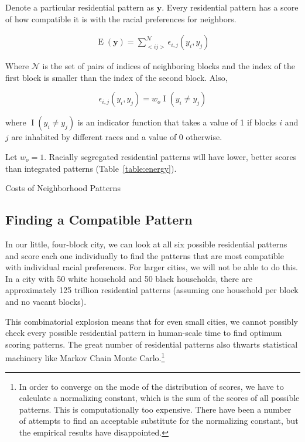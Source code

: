 Denote a particular residential pattern as $\mathbf{y}$.  Every 
residential pattern has a score of how compatible it is with
the racial preferences for neighbors.

\begin{align}
\operatorname{E}(\mathbf{y}) = \sum_{<i j>}^{\mathcal{N}}\epsilon_{i,j}(y_i,y_j)
\end{align}

Where $\mathcal{N}$ is the set of pairs of indices of neighboring
blocks and the index of the first block is smaller than the index of
the second block. Also, 

\begin{equation}
  \epsilon_{i,j}(y_i,y_j) = w_o\operatorname{I}(y_i \neq y_j)
\end{equation}

where $\operatorname{I}(y_i \neq y_j)$ is an indicator function that
takes a value of 1 if blocks $i$ and $j$ are inhabited by different
races and a value of 0 otherwise.

Let $w_o=1$. Racially segregated residential patterns will have lower,
better scores than integrated patterns (Table~\ref{table:energy}).

\begin{table}[h]

\caption{Costs of Neighborhood Patterns}
\label{table:energy}
\end{table}

\subsection*{Finding a Compatible Pattern}
In our little, four-block city, we can look at all six possible
residential patterns and score each one individually to find the
patterns that are most compatible with individual racial
preferences. For larger cities, we will not be able to do this. In a
city with 50 white household and 50 black households, there are
approximately 125 trillion residential patterns (assuming one
household per block and no vacant blocks).

This combinatorial explosion means that for even small cities, we
cannot possibly check every possible residential pattern in
human-scale time to find optimum scoring patterns. The great number of
residential patterns also thwarts statistical machinery like Markov
Chain Monte Carlo.\footnote{In order to converge on the mode of the
  distribution of scores, we have to calculate a normalizing constant,
  which is the sum of the scores of all possible patterns. This is
  computationally too expensive. There have been a number of attempts
  to find an acceptable substitute for the normalizing constant, but
  the empirical results have disappointed.\cite{li_mrf_2009}}

